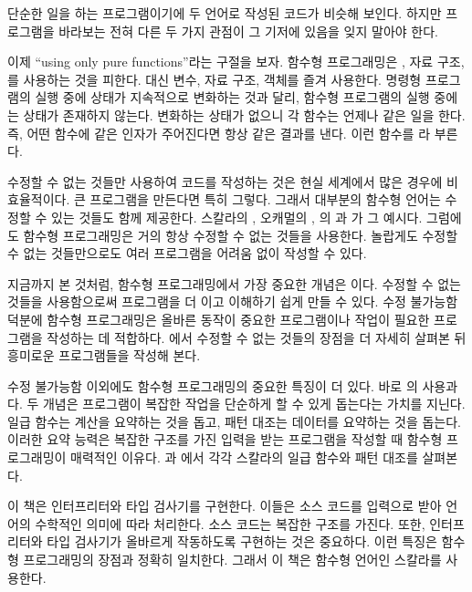 단순한 일을 하는 프로그램이기에 두 언어로 작성된 코드가 비슷해 보인다. 하지만
프로그램을 바라보는 전혀 다른 두 가지 관점이 그 기저에 있음을 잊지 말아야 한다.

이제 ``using only pure functions''라는 구절을 보자. 함수형 프로그래밍은
 , 자료 구조,
를 사용하는 것을 피한다.
대신  변수, 자료 구조, 객체를 즐겨 사용한다. 명령형
프로그램의 실행 중에 상태가 지속적으로 변화하는 것과 달리, 함수형 프로그램의
실행 중에는 상태가 존재하지 않는다. 변화하는 상태가 없으니 각 함수는 언제나 같은
일을 한다. 즉, 어떤 함수에 같은 인자가 주어진다면 항상 같은 결과를 낸다. 이런
함수를 라 부른다.

수정할 수 없는 것들만 사용하여 코드를 작성하는 것은 현실 세계에서 많은 경우에
비효율적이다. 큰 프로그램을 만든다면 특히 그렇다. 그래서 대부분의 함수형 언어는
수정할 수 있는 것들도 함께 제공한다. 스칼라의 , 오캐멀의 ,
의
과 가 그 예시다. 그럼에도 함수형 프로그래밍은 거의 항상 수정할 수 없는
것들을 사용한다. 놀랍게도 수정할 수 없는 것들만으로도 여러 프로그램을 어려움 없이
작성할 수 있다.

지금까지 본 것처럼, 함수형 프로그래밍에서 가장 중요한 개념은 이다.
수정할 수 없는 것들을 사용함으로써 프로그램을 더 이고
이해하기 쉽게 만들 수 있다. 수정 불가능함 덕분에 함수형 프로그래밍은 올바른
동작이 중요한 프로그램이나  작업이 필요한 프로그램을 작성하는 데
적합하다. 에서 수정할 수 없는 것들의 장점을 더 자세히 살펴본 뒤 흥미로운
프로그램들을 작성해 본다.

수정 불가능함 이외에도 함수형 프로그래밍의 중요한 특징이 더 있다. 바로
의 사용과 다. 두 개념은
프로그램이 복잡한 작업을 단순하게 할 수 있게 돕는다는 가치를
지닌다. 일급 함수는 계산을 요약하는 것을 돕고, 패턴 대조는 데이터를 요약하는
것을 돕는다. 이러한 요약 능력은 복잡한 구조를 가진 입력을 받는 프로그램을 작성할
때 함수형 프로그래밍이 매력적인 이유다. 과 에서 각각 스칼라의 일급 함수와
패턴 대조를 살펴본다.

이 책은 인터프리터와 타입 검사기를 구현한다. 이들은 소스 코드를 입력으로 받아
언어의 수학적인 의미에 따라 처리한다. 소스 코드는 복잡한 구조를 가진다. 또한,
인터프리터와 타입 검사기가 올바르게 작동하도록 구현하는 것은 중요하다. 이런
특징은 함수형 프로그래밍의 장점과 정확히 일치한다. 그래서 이 책은 함수형
언어인 스칼라를 사용한다.

